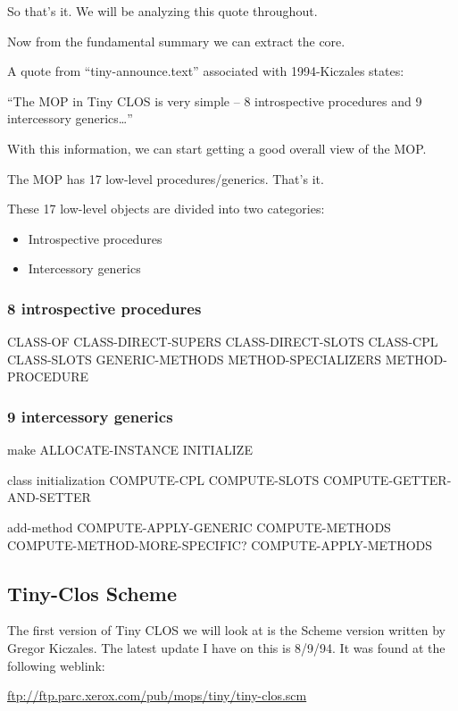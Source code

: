 \documentclass[11pt]{article}
\begin{document}
So that's it. We will be analyzing this quote throughout.

Now from the fundamental summary we can extract the core.

A quote from ``tiny-announce.text'' associated with 1994-Kiczales states:

``The MOP in Tiny CLOS is very simple -- 8 introspective procedures
and 9 intercessory generics\ldots{}''

With this information, we can start getting a good overall view
of the MOP. 

The MOP has 17 low-level procedures/generics. That's it.

These 17 low-level objects are divided into two categories:
\begin{itemize}
\item Introspective procedures
\item Intercessory generics
\end{itemize}
\subsubsection{8 introspective procedures}
\label{sec-1.1.1}

CLASS-OF
CLASS-DIRECT-SUPERS
CLASS-DIRECT-SLOTS
CLASS-CPL
CLASS-SLOTS
GENERIC-METHODS
METHOD-SPECIALIZERS
METHOD-PROCEDURE

\subsubsection{9 intercessory generics}
\label{sec-1.1.2}

make
  ALLOCATE-INSTANCE
  INITIALIZE

class initialization
  COMPUTE-CPL
  COMPUTE-SLOTS
  COMPUTE-GETTER-AND-SETTER

add-method
  COMPUTE-APPLY-GENERIC
    COMPUTE-METHODS
      COMPUTE-METHOD-MORE-SPECIFIC?
    COMPUTE-APPLY-METHODS

\subsection{Tiny-Clos Scheme}
\label{sec-1.2}

The first version of Tiny CLOS we will look at is the
Scheme version written by Gregor Kiczales. The latest
update I have on this is 8/9/94. It was found at the
following weblink:

\href{ftp://ftp.parc.xerox.com/pub/mops/tiny/tiny-clos.scm}{ftp://ftp.parc.xerox.com/pub/mops/tiny/tiny-clos.scm}
\end{document}
